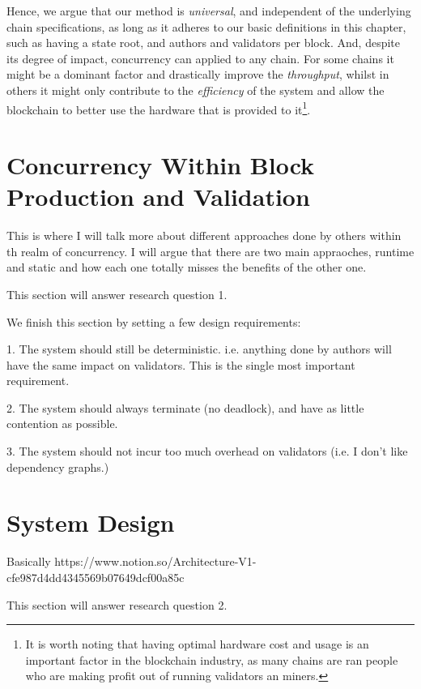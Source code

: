Hence, we argue that our method is \textit{universal}, and independent of the underlying chain
specifications, as long as it adheres to our basic definitions in this chapter, such as having a
state root, and authors and validators per block. And, despite its degree of impact, concurrency can
applied to any chain. For some chains it might be a dominant factor and drastically improve the
\textit{throughput}, whilst in others it might only contribute to the \textit{efficiency} of the
system and allow the blockchain to better use the hardware that is provided to it\footnote{It is
worth noting that having optimal hardware cost and usage is an important factor in the blockchain
industry, as many chains are ran people who are making profit out of running validators an miners.}.


\section{Concurrency Within Block Production and Validation}

This is where I will talk more about different approaches done by others within th realm of
concurrency. I will argue that there are two main appraoches, runtime and static and how each one
totally misses the benefits of the other one.

This section will answer research question 1.

We finish this section by setting a few design requirements:

1. The system should still be deterministic. i.e. anything done by authors will have the same
impact on validators. This is the single most important requirement.

2. The system should always terminate (no deadlock), and have as little contention as possible.

3. The system should not incur too much overhead on validators (i.e. I don't like dependency
graphs.)

\section{System Design} \label{chap_desgin:sec:design}

Basically https://www.notion.so/Architecture-V1-cfe987d4dd4345569b07649dcf00a85c

This section will answer research question 2.
